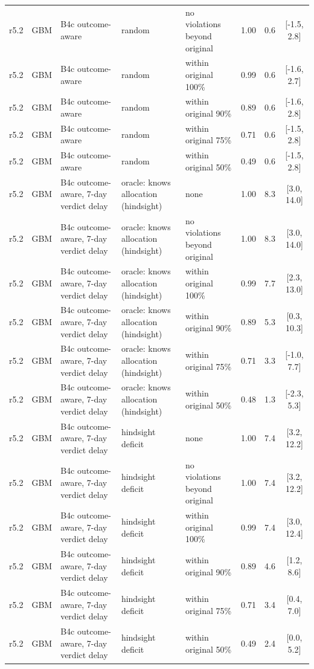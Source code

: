 \begin{longtable}{lllp{4.2cm}p{3.4cm}ccc}
r5.2 & GBM & B4c outcome-aware & random & no violations beyond original & 1.00 & 0.6 & [-1.5, 2.8] \\
r5.2 & GBM & B4c outcome-aware & random & within original 100\% & 0.99 & 0.6 & [-1.6, 2.7] \\
r5.2 & GBM & B4c outcome-aware & random & within original 90\% & 0.89 & 0.6 & [-1.6, 2.8] \\
r5.2 & GBM & B4c outcome-aware & random & within original 75\% & 0.71 & 0.6 & [-1.5, 2.8] \\
r5.2 & GBM & B4c outcome-aware & random & within original 50\% & 0.49 & 0.6 & [-1.5, 2.8] \\
r5.2 & GBM & B4c outcome-aware, 7-day verdict delay & oracle: knows allocation (hindsight) & none & 1.00 & 8.3 & [3.0, 14.0] \\
r5.2 & GBM & B4c outcome-aware, 7-day verdict delay & oracle: knows allocation (hindsight) & no violations beyond original & 1.00 & 8.3 & [3.0, 14.0] \\
r5.2 & GBM & B4c outcome-aware, 7-day verdict delay & oracle: knows allocation (hindsight) & within original 100\% & 0.99 & 7.7 & [2.3, 13.0] \\
r5.2 & GBM & B4c outcome-aware, 7-day verdict delay & oracle: knows allocation (hindsight) & within original 90\% & 0.89 & 5.3 & [0.3, 10.3] \\
r5.2 & GBM & B4c outcome-aware, 7-day verdict delay & oracle: knows allocation (hindsight) & within original 75\% & 0.71 & 3.3 & [-1.0, 7.7] \\
r5.2 & GBM & B4c outcome-aware, 7-day verdict delay & oracle: knows allocation (hindsight) & within original 50\% & 0.48 & 1.3 & [-2.3, 5.3] \\
r5.2 & GBM & B4c outcome-aware, 7-day verdict delay & hindsight deficit & none & 1.00 & 7.4 & [3.2, 12.2] \\
r5.2 & GBM & B4c outcome-aware, 7-day verdict delay & hindsight deficit & no violations beyond original & 1.00 & 7.4 & [3.2, 12.2] \\
r5.2 & GBM & B4c outcome-aware, 7-day verdict delay & hindsight deficit & within original 100\% & 0.99 & 7.4 & [3.0, 12.4] \\
r5.2 & GBM & B4c outcome-aware, 7-day verdict delay & hindsight deficit & within original 90\% & 0.89 & 4.6 & [1.2, 8.6] \\
r5.2 & GBM & B4c outcome-aware, 7-day verdict delay & hindsight deficit & within original 75\% & 0.71 & 3.4 & [0.4, 7.0] \\
r5.2 & GBM & B4c outcome-aware, 7-day verdict delay & hindsight deficit & within original 50\% & 0.49 & 2.4 & [0.0, 5.2] \\

\end{longtable}
